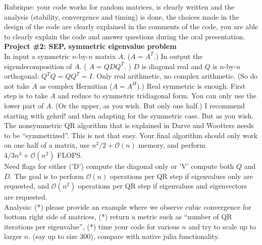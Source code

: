 \documentclass[11pt,letterpaper]{article}
\begin{document}
Rubrique: your code works for random matrices, is clearly written
and the analysis (stability, convergence and timing) is done, the choices made
in the design of the code are clearly explained in the comments of the code, you are able to clearly 
explain the code and answer questions 
during the oral presentation.\\





{\Large \bf Project \#2: SEP, symmetric eigenvalue problem}\\

In input a symmetric $n$-by-$n$ matrix $A$. ($A=A^T$.) In output the
eigendecomposition of $A$. ( $A = Q D Q^T$. ) $D$ is diagonal real and $Q$ is
$n$-by-$n$ orthogonal: $Q^TQ = QQ^T = I$. Only real arithmetic, no complex
arithmetic. (So do not take $A$ as complex Hermitian ($A=A^H$).) Real symmetric
is enough. First step is to take $A$ and reduce to symmetric tridiagonal form.
You can only use the lower part of $A$. (Or the upper, as you wish. But only
one half.) I recommend starting with gehrd! and then adapting for the symmetric
case. But as you wish. The nonsymmetric QR algorithm that is explained in Darve and Wootters 
needs to be ``symmetrized''. This is not that easy. Your final algorithm should only work on 
one half of a matrix, use $n^2/2+\mathcal{O}(n)$ memory, and perform $4/3 n^3+\mathcal{O}(n^2)$ FLOPS.\\

Need flags for
either ('D') compute the diagonal only or 'V'
compute both $Q$ and $D$. 
The goal is to perform $\mathcal{O}(n)$ operations per QR step if eigenvalues only are requested,
and $\mathcal{O}(n^2)$ operations per QR step if eigenvalues and eigenvectors are requested.\\

Analysis: (*) please provide an example where we observe cubic convergence for bottom right side of matrices,
(*) return a metric such as ``number of QR iterations per eigenvalue'', (*) time
your code for various $n$ and try to scale up to larger $n$.
(say up to size $300$), 
compare with native julia functionality.\\
\end{document}
